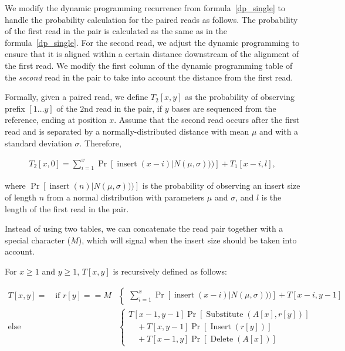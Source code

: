 \documentclass[12pt,\mydriver]{thesis}
\begin{document}
We modify the dynamic programming recurrence from formula~\eqref{dp_single} to handle the probability calculation for the paired reads as follows.
The probability of the first read in the pair is calculated as the same as in the formula~\eqref{dp_single}.  For the second read, we adjust the dynamic programming to ensure that it is aligned within a certain distance downstream of the alignment of the first read.
We modify the first column of the dynamic programming table of the \emph{second} read in the pair to take into account the distance from the first read.

Formally, given a paired read, we define $T_2[x,y]$ as the probability of observing prefix $[1 \ldots y]$ of the $2$nd read in the pair, if $y$ bases are sequenced from the reference, ending at position $x$.
Assume that the second read occurs after the first read and is separated by a normally-distributed distance with mean $\mu$ and with a standard deviation $\sigma$.
Therefore,

\begin{align}
T_2[x, 0] = \sum_{i=1}^{x}{\Pr[\operatorname{insert}(x-i)|N(\mu,\sigma)))] + T_1[x-i,l]},
\end{align}

\noindent where $\Pr[\operatorname{insert}(n)|N(\mu,\sigma)))]$ is the probability of observing an insert size of length $n$ from a normal distribution with parameters $\mu$ and $\sigma$, and $l$ is the length of the first read in the pair.

Instead of using two tables, we can concatenate the read pair together with a special character ($M$), which will signal when the insert size should be taken into account.

For $x \geq 1$ and $y \geq 1$, $T[x, y]$ is recursively defined as follows:

\begin{equation}
\begin{aligned}
T[x, y] = \quad
\text{if }r[y] == M&\begin{cases}
\sum_{i=1}^{x}{\Pr[\operatorname{insert}(x-i)|N(\mu,\sigma)))] + T[x-i,y-1]}
\end{cases}
\\
\text{else }&\begin{cases} T[x - 1, y - 1] \Pr[\operatorname{Substitute}(A[x], r[y])] \\
\quad + T[x, y - 1]\Pr[\operatorname{Insert}(r[y])]  \\
\quad + T[x - 1, y]\Pr[\operatorname{Delete}(A[x])]
\end{cases}
\end{aligned}
\end{equation}
\end{document}
